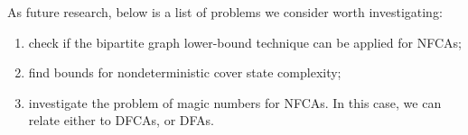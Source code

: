 \documentclass[submission,copyright,creativecommons]{eptcs}
\begin{document}
As future research, below is a list of problems we consider worth investigating:
\begin{enumerate}
 \item check if the bipartite graph lower-bound
 technique can be applied for \mbox{NFCAs;}
 \item find bounds for nondeterministic cover state complexity;
 \item investigate the problem of magic numbers for NFCAs. 
In this case, we can relate either to DFCAs, or DFAs. 
\end{enumerate}




\end{document}
